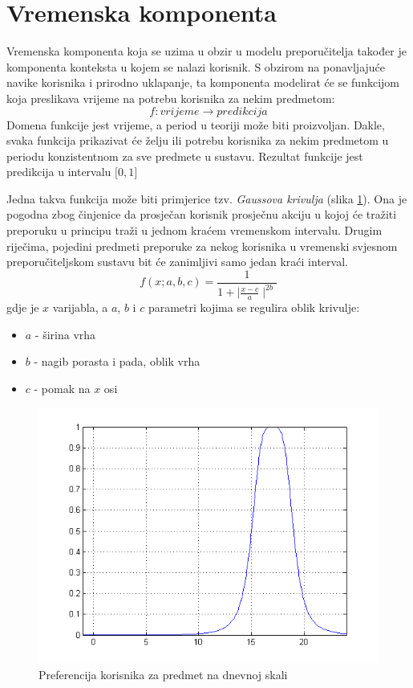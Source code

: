 \documentclass[times, utf8, diplomski, numeric]{fer}
\begin{document}
\section{Vremenska komponenta}
Vremenska komponenta koja se uzima u obzir u modelu preporučitelja također je
komponenta konteksta u kojem se nalazi korisnik. S obzirom na ponavljajuće
navike korisnika i prirodno uklapanje, ta komponenta modelirat će se funkcijom
koja preslikava vrijeme na potrebu korisnika za nekim predmetom:
\begin{equation}
	\label{eq:time}
	f: vrijeme \rightarrow predikcija
\end{equation}
Domena funkcije jest vrijeme, a period u teoriji može biti proizvoljan. Dakle,
svaka funkcija prikazivat će želju ili potrebu korisnika za nekim predmetom u
periodu konzistentnom za sve predmete u sustavu. Rezultat funkcije jest
predikcija u intervalu $\big[ 0, 1 \big]$

Jedna takva funkcija može biti primjerice tzv. \emph{Gaussova krivulja}
(slika \ref{fig:Gauss1}). Ona je pogodna zbog činjenice da prosječan korisnik
prosječnu akciju u kojoj će tražiti preporuku u principu traži u jednom kraćem
vremenskom intervalu. Drugim riječima, pojedini predmeti preporuke za nekog
korisnika u vremenski svjesnom preporučiteljskom sustavu bit će zanimljivi samo
jedan kraći interval.
\begin{equation}
	\label{eq:BellFunc}
	f(x;a,b,c) = \frac
	{
		1
	}
	{
		1 + \mid\frac{x - c}{a}\mid^{2b}
	}
\end{equation}
gdje je $x$ varijabla, a $a$, $b$ i $c$ parametri kojima se regulira oblik
krivulje:
\begin{itemize}
  \item $a$ - širina vrha
  \item $b$ - nagib porasta i pada, oblik vrha
  \item $c$ - pomak na $x$ osi
\end{itemize}

\begin{figure}[H]
	\centering
	\includegraphics[width=12cm]{images/zvonolika1matlab.png}
	\caption{Preferencija korisnika za predmet na dnevnoj skali}
	\label{fig:Gauss1}
\end{figure}
\end{document}
